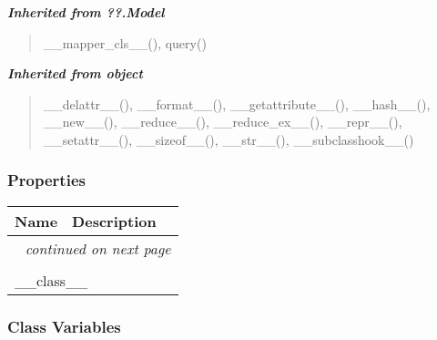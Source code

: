 \large{\textbf{\textit{Inherited from ??.Model}}}

\begin{quote}
\_\_mapper\_cls\_\_(), query()
\end{quote}

\large{\textbf{\textit{Inherited from object}}}

\begin{quote}
\_\_delattr\_\_(), \_\_format\_\_(), \_\_getattribute\_\_(), \_\_hash\_\_(), \_\_new\_\_(), \_\_reduce\_\_(), \_\_reduce\_ex\_\_(), \_\_repr\_\_(), \_\_setattr\_\_(), \_\_sizeof\_\_(), \_\_str\_\_(), \_\_subclasshook\_\_()
\end{quote}


  \subsubsection{Properties}

    \vspace{-1cm}
\hspace{\varindent}\begin{longtable}{|p{\varnamewidth}|p{\vardescrwidth}|l}
\cline{1-2}
\cline{1-2} \centering \textbf{Name} & \centering \textbf{Description}& \\
\cline{1-2}
\endhead\cline{1-2}\multicolumn{3}{r}{\small\textit{continued on next page}}\\\endfoot\cline{1-2}
\endlastfoot\multicolumn{2}{|l|}{\textit{Inherited from object}}\\
\multicolumn{2}{|p{\varwidth}|}{\raggedright \_\_class\_\_}\\
\cline{1-2}
\end{longtable}



  \subsubsection{Class Variables}

